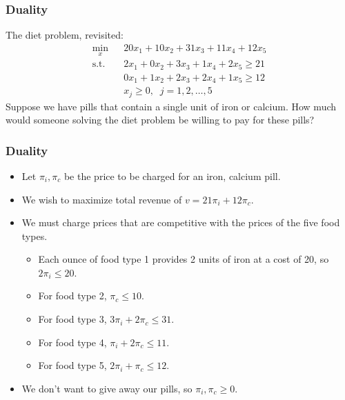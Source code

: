 \documentclass[12pt,handout]{beamer}
\begin{document}
\begin{frame}
\frametitle{Duality}
The diet problem, revisited:
\begin{eqnarray}
\min_x && 20x_1 + 10x_2 + 31x_3 + 11x_4 + 12x_5 \nonumber \\
\mbox{s.t.} && 2x_1 + 0x_2 + 3x_3 + 1x_4 + 2x_5 \ge 21 \nonumber \\
&& 0x_1 + 1x_2 + 2x_3 + 2x_4 + 1x_5 \ge 12 \nonumber \\
&& x_j \ge 0,\;\;j=1,2,\ldots, 5 \nonumber
\end{eqnarray}
Suppose we have pills that contain a single unit of iron or calcium. How much would someone solving the diet problem be willing to pay for these pills?
\end{frame}

\begin{frame}
\frametitle{Duality}
\begin{itemize}
\item Let $\pi_i, \pi_c$ be the price to be charged for an iron, calcium pill.
\item We wish to maximize total revenue of $v = 21 \pi_i + 12 \pi_c$.
\item We must charge prices that are competitive with the prices of the five food types.
    \begin{itemize}
    \item Each ounce of food type 1 provides 2 units of iron at a cost of 20, so $2\pi_i \le 20$.
    \item For food type 2, $\pi_c \le 10$.
    \item For food type 3, $3\pi_i + 2\pi_c \le 31$.
    \item For food type 4, $\pi_i + 2\pi_c \le 11$.
    \item For food type 5, $2\pi_i + \pi_c \le 12$.
    \end{itemize}
\item We don't want to give away our pills, so $\pi_i, \pi_c \ge 0$.
\end{itemize}
\end{frame}
\end{document}
